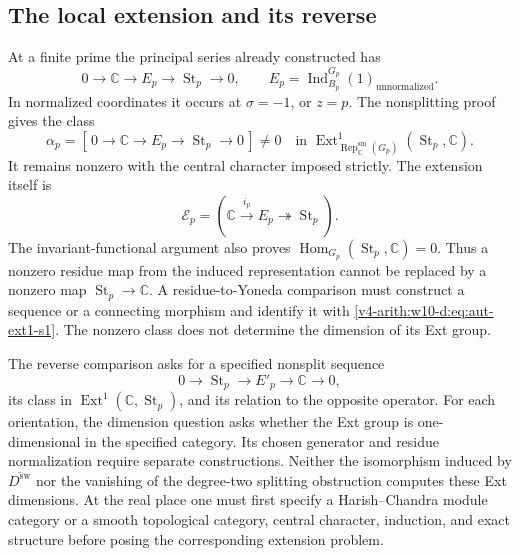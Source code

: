 \subsection{The local extension and its reverse}
\label{v4-arith:w10-d:def:aut-ext1-s1}
At a finite prime the principal series already constructed has
\[
 0\longrightarrow\mathbb C\longrightarrow E_p
      \longrightarrow\operatorname{St}_p\longrightarrow0,
 \qquad E_p=\operatorname{Ind}^{G_p}_{B_p}(1)_{\mathrm{unnormalized}}.
\]
In normalized coordinates it occurs at $\sigma=-1$, or $z=p$.
The nonsplitting proof gives the class
\begin{equation}\label{v4-arith:w10-d:eq:aut-ext1-s1}
 \alpha_p=[\,0\to\mathbb C\to E_p\to\operatorname{St}_p\to0\,]
       \ne0\quad\text{in }\operatorname{Ext}^1_{\operatorname{Rep}^{\mathrm{sm}}_\mathbb C(G_p)}
                      (\operatorname{St}_p,\mathbb C).
\end{equation}
\label{v4-arith:w10-d:prop:alpha-exists}
It remains nonzero with the central character imposed strictly.
The extension itself is
\begin{equation}\label{v4-arith:w10-d:eq:aut-seq-s1}
 \mathcal E_p=(\mathbb C\xrightarrow{i_p}E_p\twoheadrightarrow\operatorname{St}_p).
\end{equation}
The invariant-functional argument also proves
$\operatorname{Hom}_{G_p}(\operatorname{St}_p,\mathbb C)=0$.
Thus a nonzero residue map from the induced representation cannot be
replaced by a nonzero map $\operatorname{St}_p\to\mathbb C$.
A residue-to-Yoneda comparison must construct a sequence or a connecting
morphism and identify it with \eqref{v4-arith:w10-d:eq:aut-ext1-s1}.
The nonzero class does not determine the dimension of its Ext group.

\begin{remark}
\label{v4-arith:w10-d:prop:reducibility-s0}
\label{v4-arith:w10-d:cor:alpha-s0}
The reverse comparison asks for a specified nonsplit sequence
\begin{equation}\label{v4-arith:w10-d:eq:reducibility-s0}
 0\longrightarrow\operatorname{St}_p\longrightarrow E'_p
      \longrightarrow\mathbb C\longrightarrow0,
\end{equation}
its class in
$\operatorname{Ext}^1(\mathbb C,\operatorname{St}_p)$, and its relation
to the opposite operator. For each orientation, the dimension question asks whether the Ext
group is one-dimensional in the specified category. Its chosen
generator and residue normalization require separate constructions.
Neither the isomorphism induced by $\overline{D^{\mathrm{sw}}}$ nor the
vanishing of the degree-two splitting obstruction computes these
Ext dimensions. At the real place one must first specify a
Harish--Chandra module category or a smooth topological category,
central character, induction, and exact structure before posing the
corresponding extension problem.
\end{remark}

